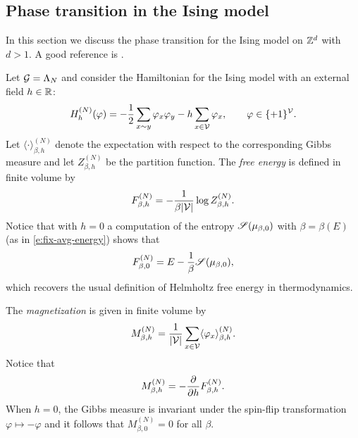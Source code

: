 \subsection{Phase transition in the Ising model}

In this section we discuss the phase transition for the Ising model on ${ {{\mathbb Z}}^d }$ with $d > 1$.
A good reference is \cite{FV17}.

Let $\mathcal{G} = \Lambda_N$
and consider the Hamiltonian for the Ising model with an external field $h\in{\mathbb R}$:
\begin{equation}
H^{(N)}_h(\varphi)
	=
-\frac12 \sum_{x \sim y} \varphi_x \varphi_y
- h \sum_{x\in\mathcal{V}} \varphi_x,
	\qquad
\varphi\in\{+1\}^{\mathcal{V}}.
\end{equation}
% 
Let $\langle\cdot\rangle^{(N)}_{\beta,h}$ denote the expectation with respect to
the corresponding Gibbs measure and let $Z^{(N)}_{\beta,h}$ be the partition function.
The \emph{free energy} is defined in finite volume by
\begin{equation}
F^{(N)}_{\beta,h}
	=
-\frac{1}{\beta |\mathcal{V}|} \log Z^{(N)}_{\beta,h}.
\end{equation}
Notice that with $h = 0$ a computation of the entropy $\mathscr{S}(\mu_{\beta,0})$
with $\beta = \beta(E)$ (as in \eqref{e:fix-avg-energy}) shows that
\begin{equation}
F^{(N)}_{\beta,0} = E - \frac{1}{\beta} \mathscr{S}(\mu_{\beta,0}),
\end{equation}
which recovers the usual definition of Helmholtz free energy in thermodynamics.

The \emph{magnetization} is given in finite volume by
\begin{equation}
M^{(N)}_{\beta,h}
	=
\frac{1}{|\mathcal{V}|} \sum_{x\in \mathcal{V}} \langle \varphi_x \rangle^{(N)}_{\beta,h}.
\end{equation}
Notice that
\begin{equation}
M^{(N)}_{\beta,h}
	=
-\frac{\partial }{\partial h} F^{(N)}_{\beta,h}.
\end{equation}
When $h = 0$, the Gibbs measure is invariant under the spin-flip transformation
$\varphi \mapsto -\varphi$ and it follows that $M^{(N)}_{\beta,0} = 0$ for all $\beta$.

